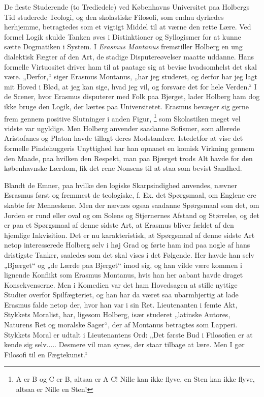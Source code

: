 \documentclass[12pt,a4paper,openany]{book}
\newcommand{\opage}[1]{\marginnote{\footnotesize\textit{[#1]}}}
\begin{document}
De fleste Studerende (to Trediedele) ved Københavns Universitet paa Holbergs
Tid studerede Teologi, og den skolastiske Filosofi, som endnu dyrkedes
herhjemme, betragtedes som et vigtigt Middel til at værne den rette Lære. Ved
formel Logik skulde Tanken øves i Distinktioner og Syllogismer for at kunne
sætte Dogmatiken i System. I \textit{Erasmus Montanus} fremstiller Holberg en
ung dialektisk Fægter af den Art, de stadige Disputereøvelser maatte uddanne.
Hans formelle Virtuositet driver ham til at paatage sig at bevise hvadsomhelst
det skal være. „Derfor,“ siger Erasmus Montanus, „har jeg studeret, og derfor
har jeg lagt mit Hoved i Blød, at jeg kan sige, hvad jeg vil, og forsvare det
for hele Verden.“ I de Scener, hvor Erasmus disputerer med Folk paa Bjerget,
lader Holberg ham dog ikke bruge den Logik, der lærtes paa Universitetet.
Erasmus bevæger sig gerne frem gennem positive Slutninger i anden Figur,%
\footnote[1]{A er B og C er B, altsaa er A C! Nille kan ikke flyve, en Sten kan
ikke flyve, altsaa er Nille en Sten!} som Skolastiken meget vel vidste var
ugyldige. Men Holberg anvender saadanne Sofismer, som allerede Aristofanes og
Platon havde tillagt deres Modstandere. Istedetfor at vise det formelle
Pindehuggeris Unyttighed har han opnaaet en komisk Virkning gennem den Maade,
paa hvilken den Respekt, man paa Bjærget trods Alt havde for den københavnske
Lærdom, fik det rene Nonsens til at staa som bevist Sandhed.

Blandt de Emner, paa hvilke den logiske Skarpsindighed anvendes, nævner
Esrasmus først og fremmest de teologiske, f. Ex. det Spørgsmaal, om Englene ere
skabte før Menneskene. Men der nævnes ogsaa saadanne Spørgsmaal som det, om
Jorden er rund eller oval og om Solens og Stjernernes Afstand og Størrelse, og
det er paa et Spørgsmaal af denne
\setcounter{footnote}{0}%
\opage{8}sidste Art, at Erasmus bliver fældet af den hjemlige Inkvisition. Det
er nu karakteristisk, at Spørgsmaal af denne sidste Art netop interesserede
Holberg selv i høj Grad og førte ham ind paa nogle af hans dristigste Tanker,
saaledes som det skal vises i det Følgende. Her havde han selv „Bjærget“ og „de
Lærde paa Bjerget“ imod sig, og han vilde være kommen i lignende Konflikt som
Erasmus Montanus, hvis han her aabant havde draget Konsekvenserne. Men i
Komedien var det ham Hovedsagen at stille nyttige Studier overfor
Spilfægteriet, og han har da været saa ubarmhjertig at lade Erasmus falde netop
der, hvor han var i sin Ret. Lieutenanten i femte Akt, Stykkets Moralist, har,
ligesom Holberg, især studeret „latinske Autores, Naturens Ret og moralske
Sager“, der af Montanus betragtes som Lapperi. Stykkets Moral er udtalt i
Lieutenantens Ord: „Det første Bud i Filosofien er at kende sig selv.....
Desmere vil man synes, der staar tilbage at lære. Men I gør Filosofi til en
Fægtekunst.“
\end{document}

